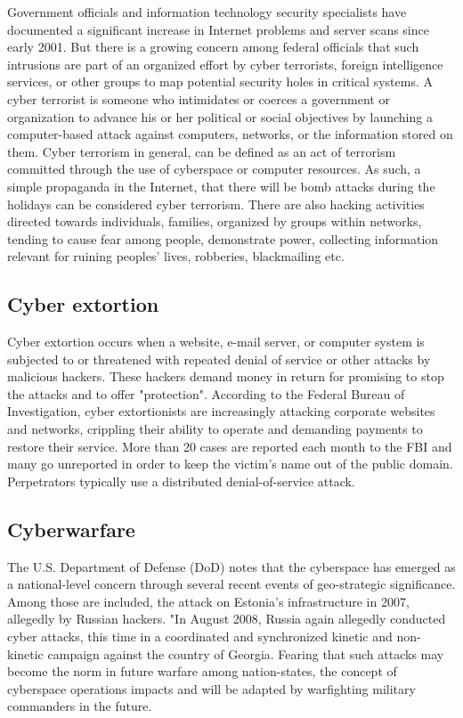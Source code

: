 \documentclass[12pt]{article}
\begin{document}
Government officials and information technology security specialists have documented a significant increase in Internet problems and server scans since early 2001. But there is a growing concern among federal officials that such intrusions are part of an organized effort by cyber terrorists, foreign intelligence services, or other groups to map potential security holes in critical systems. A cyber terrorist is someone who intimidates or coerces a government or organization to advance his or her political or social objectives by launching a computer-based attack against computers, networks, or the information stored on them. Cyber terrorism in general, can be defined as an act of terrorism committed through the use of cyberspace or computer resources. As such, a simple propaganda in the Internet, that there will be bomb attacks during the holidays can be considered cyber terrorism. There are also hacking activities directed towards individuals, families, organized by groups within networks, tending to cause fear among people, demonstrate power, collecting information relevant for ruining peoples' lives, robberies, blackmailing etc.

\subsection{Cyber extortion}

Cyber extortion occurs when a website, e-mail server, or computer system is subjected to or threatened with repeated denial of service or other attacks by malicious hackers. These hackers demand money in return for promising to stop the attacks and to offer "protection". According to the Federal Bureau of Investigation, cyber extortionists are increasingly attacking corporate websites and networks, crippling their ability to operate and demanding payments to restore their service. More than 20 cases are reported each month to the FBI and many go unreported in order to keep the victim's name out of the public domain. Perpetrators typically use a distributed denial-of-service attack.

\subsection{Cyberwarfare}

The U.S. Department of Defense (DoD) notes that the cyberspace has emerged as a national-level concern through several recent events of geo-strategic significance. Among those are included, the attack on Estonia's infrastructure in 2007, allegedly by Russian hackers. "In August 2008, Russia again allegedly conducted cyber attacks, this time in a coordinated and synchronized kinetic and non-kinetic campaign against the country of Georgia. Fearing that such attacks may become the norm in future warfare among nation-states, the concept of cyberspace operations impacts and will be adapted by warfighting military commanders in the future.
\end{document}
